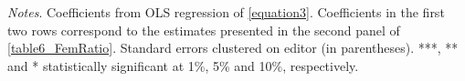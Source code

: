 \begin{table}
\begin{threeparttable}
\begin{tabular}{p{3cm}S@{}S@{}S@{}S@{}S@{}}
            \bottomrule
        \end{tabular}
        \begin{tablenotes}
            \tiny
            \item \textit{Notes}. Coefficients from OLS regression of \autoref{equation3}. Coefficients in the first two rows correspond to the estimates presented in the second panel of \autoref{table6_FemRatio}. Standard errors clustered on editor (in parentheses). ***, ** and * statistically significant at 1\%, 5\% and 10\%, respectively.
        \end{tablenotes}
    \end{threeparttable}
\end{table}